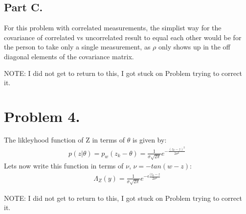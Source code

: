 \documentclass{article}
\begin{document}
\subsection*{Part C.}
For this problem with correlated measurements, the simplist way for the covariance of correlated vs uncorrelated result to equal each other would be for the person to take only a single measurement, as $\rho$ only shows up in the off diagonal elements of the covariance matrix.



NOTE: I did not get to return to this, I got stuck on Problem trying to correct it.

\clearpage
\section*{Problem 4.}
The likleyhood function of Z in terms of $\theta$ is given by:
\begin{align*}
p(z|\theta) = p_w(z_k-\theta) = \frac{1}{\sigma \sqrt{2\pi}} e^{-\tfrac{(z_k-z)^2}{2\sigma^2}}
\end{align*}
Lets now write this function in terms of $\nu$, $\nu = -tan(w-z)$:
\begin{align*}
\Lambda_Z(y) = \frac{1}{\sigma \sqrt{2\pi}} e^{-\epsilon \tfrac{(z_k - z}{2\sigma^2}}
\end{align*}

NOTE: I did not get to return to this, I got stuck on Problem trying to correct it.


\clearpage
\end{document}
